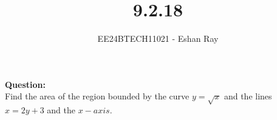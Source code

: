 \documentclass[journal]{IEEEtran}
\begin{document}

\vspace{3cm}

\title{9.2.18}
\author{EE24BTECH11021 - Eshan Ray}

{\let\newpage\relax\maketitle}

\renewcommand{\thefigure}{\theenumi}
\renewcommand{\thetable}{\theenumi}
\setlength{\intextsep}{10pt} %




\textbf{Question: }\\
Find the area of the region bounded by the curve $y = \sqrt{x}$ and the lines $x = 2y  + 3$ and
the $x-axis$.\\
\end{document}
